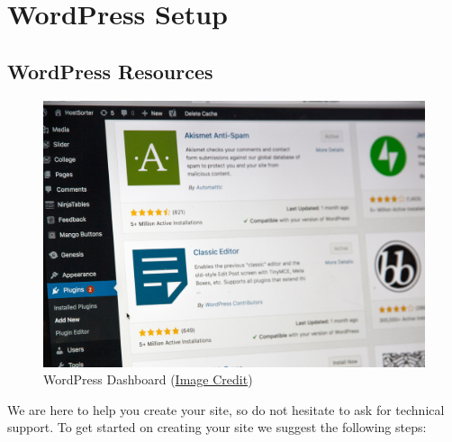 \documentclass[
]{book}
\begin{document}
\hypertarget{wordpress-setup}{%
\section{WordPress Setup}\label{wordpress-setup}}

\hypertarget{wordpress-resources}{%
\subsection*{WordPress Resources}\label{wordpress-resources}}

\begin{figure}
\centering
\includegraphics{assets/u1/stephen-phillips-hostreviews-co-uk-sSPzmL7fpWc-unsplash.jpg}
\caption{WordPress Dashboard (\href{https://unsplash.com/photos/sSPzmL7fpWc}{Image Credit})}
\end{figure}

We are here to help you create your site, so do not hesitate to ask for technical support. To get started on creating your site we suggest the following steps:
\end{document}
